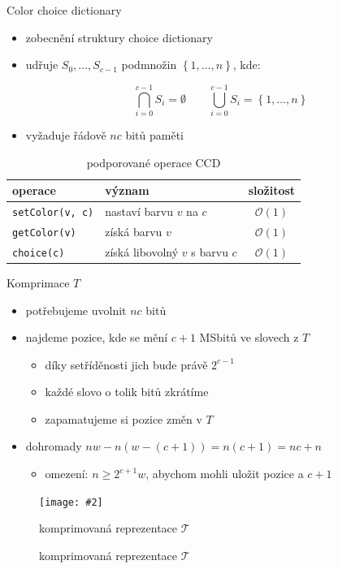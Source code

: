 \documentclass[czech]{beamer}
\makeatletter
\newcommand{\fitimage}[2][\@nil]{
	\begin{figure}
		\begin{adjustbox}{width=0.9\textwidth, totalheight=\textheight-2\baselineskip-2\baselineskip,keepaspectratio}
			\texttt{[image: \#2]}
		\end{adjustbox}
		\def\tmp{#1}%
	 \ifx\tmp\@nnil
			\else
			\caption{#1}
		\fi
	\end{figure}
}
\makeatother
\begin{document}
	\begin{frame}{Color choice dictionary}
		\begin{itemize}
			\item zobecnění struktury choice dictionary
			\item udřuje $S_0, \ldots, S_{c - 1}$ podmnožin $\left\{1, \ldots, n\right\}$, kde:

				$$\bigcap_{i=0}^{c-1} S_i = \emptyset \qquad\bigcup_{i=0}^{c-1} S_i = \left\{1, \ldots, n\right\}$$

			\item vyžaduje řádově $nc$ bitů paměti
		\end{itemize}

		\vfill

		\begin{table}
			\centering
			\begin{tabular}{llc}
				\toprule
				operace & význam & složitost \\
				\midrule
				\texttt{setColor(v, c)} & nastaví barvu $v$ na $c$        & $\mathcal{O}\left(1\right)$ \\
				\texttt{getColor(v)}    & získá barvu $v$                 & $\mathcal{O}\left(1\right)$ \\
				\texttt{choice(c)}      & získá libovolný $v$ s barvu $c$ & $\mathcal{O}\left(1\right)$ \\
				\bottomrule
			\end{tabular}
			\caption{podporované operace CCD}
		\end{table}
	\end{frame}

	\begin{frame}{Komprimace $T$}
		\begin{itemize}
			\item potřebujeme uvolnit $nc$ bitů
				\vfill
			\item najdeme pozice, kde se mění $c + 1$ MSbitů ve slovech z $T$
			\begin{itemize}
				\item díky setříděnosti jich bude právě $2^{c - 1}$
				\item každé slovo o tolik bitů zkrátíme
				\item zapamatujeme si pozice změn v $T$
			\end{itemize}
				\vfill
			\item dohromady $nw - n(w - (c + 1)) = n(c + 1) = nc + n$
			\begin{itemize}
				\item omezení: $n \ge 2^{c + 1}w$, abychom mohli uložit pozice a $c + 1$
			\end{itemize}
		\end{itemize}

		\fitimage[komprimovaná reprezentace $\mathcal{T}$]{images/compression.png}
	\end{frame}
\end{document}
